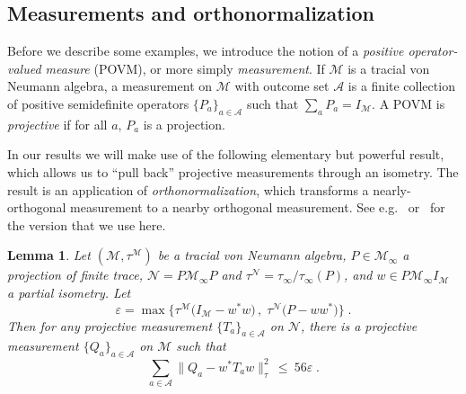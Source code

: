 \documentclass[11pt]{article}
\newtheorem{lemma}[theorem]{Lemma}
\theoremstyle{definition}
\newcommand{\Id}{\ensuremath{I}}
\newcommand{\mA}{\ensuremath{\mathcal{A}}}
\newcommand{\mM}{\ensuremath{\mathcal{M}}}
\newcommand{\eps}{\varepsilon}
\newcommand{\mN}{\mathcal{N}}
\begin{document}
	\subsection{Measurements and orthonormalization}
	\label{sec:measurements}
	
	Before we describe some examples, we introduce the notion of a \emph{positive operator-valued measure} (POVM), or more simply \emph{measurement}. If $\mM$ is a tracial von Neumann algebra, a measurement on $\mM$ with outcome set $\mA$ is a finite collection of positive semidefinite operators $\{P_a\}_{a\in \mA}$ such that $\sum_a P_a = \Id_\mM$. A POVM is \emph{projective} if for all $a$, $P_a$ is a projection. 
	
	In our results we will make use of the following elementary but powerful result, which allows us to ``pull back'' projective measurements through an isometry. The result is an application of \emph{orthonormalization}, which transforms a nearly-orthogonal measurement to a nearby orthogonal measurement. See e.g.~\cite{kempe2011parallel,ji2020quantum} or~\cite[Theorem 1.2]{de2021orthogonalization} for the version that we use here. 
	
\begin{lemma}\label{lem:pull-back}
Let  $(\mM,\tau^\mM)$ be a tracial von Neumann algebra, $P\in\mM_\infty$ a projection of finite trace, $\mN=P\mM_\infty P$ and $\tau^\mN=\tau_\infty/\tau_\infty(P)$, and $w\in P \mM_\infty \Id_\mM$ a partial isometry. Let 
\[ \eps = \max\big\{ \tau^\mM\big(\Id_\mM - w^* w\big)\,,\;\tau^\mN\big( P- w w^*\big)\big\}\;.\] 
 Then for any projective measurement $\{T_a\}_{a \in \mA}$ on $\mN$, there is a projective measurement $\{Q_a\}_{a \in \mA}$ on $\mM$ such that 
\begin{equation}
\label{eq:pull-back} \sum_{a \in \mA} \big\| Q_a - w^* T_a w\big\|_\tau^2 \,\leq \ 56\eps\;.
\end{equation}
\end{lemma}	
\end{document}
